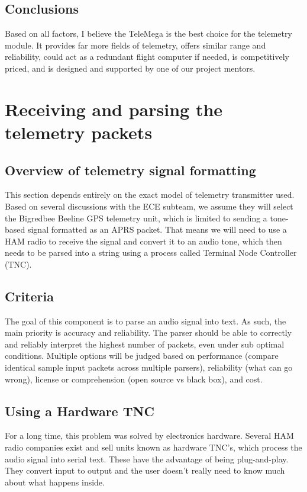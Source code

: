 \documentclass[onecolumn, draftclsnofoot, 10pt, compsoc]{IEEEtran}
\begin{document}
\subsection{Conclusions}
Based on all factors, I believe the TeleMega is the best choice for the telemetry module.  It provides far more fields of telemetry, offers similar range and reliability, could act as a redundant flight computer if needed, is competitively priced, and is designed and supported by one of our project mentors.

\section{Receiving and parsing the telemetry packets}

\subsection{Overview of telemetry signal formatting}
This section depends entirely on the exact model of telemetry transmitter used.  Based on several discussions with the ECE subteam, we assume they will select the Bigredbee Beeline GPS telemetry unit, which is limited to sending a tone-based signal formatted as an APRS packet.  That means we will need to use a HAM radio to receive the signal and convert it to an audio tone, which then needs to be parsed into a string using a process called Terminal Node Controller (TNC).

\subsection{Criteria}
The goal of this component is to parse an audio signal into text.  As such, the main priority is accuracy and reliability.  The parser should be able to correctly and reliably interpret the highest number of packets, even under sub optimal conditions.  Multiple options will be judged based on performance (compare identical sample input packets across multiple parsers), reliability (what can go wrong), license or comprehension (open source vs black box), and cost.

\subsection{Using a Hardware TNC}
For a long time, this problem was solved by electronics hardware.  Several HAM radio companies exist and sell units known as hardware TNC's, which process the audio signal into serial text.  These have the advantage of being plug-and-play.  They convert input to output and the user doesn't really need to know much about what happens inside.
\end{document}
